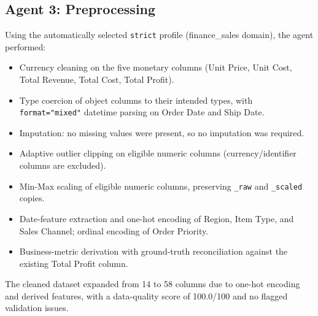 \documentclass[12pt,a4paper,openany]{report}
\begin{document}
\subsection{Agent 3: Preprocessing}
Using the automatically selected \texttt{strict} profile (finance\_sales domain), the agent performed:
\begin{itemize}
	\item Currency cleaning on the five monetary columns (Unit Price, Unit Cost, Total Revenue, Total Cost, Total Profit).
	\item Type coercion of object columns to their intended types, with \texttt{format="mixed"} datetime parsing on Order Date and Ship Date.
	\item Imputation: no missing values were present, so no imputation was required.
	\item Adaptive outlier clipping on eligible numeric columns (currency/identifier columns are excluded).
	\item Min-Max scaling of eligible numeric columns, preserving \texttt{\_raw} and \texttt{\_scaled} copies.
	\item Date-feature extraction and one-hot encoding of Region, Item Type, and Sales Channel; ordinal encoding of Order Priority.
	\item Business-metric derivation with ground-truth reconciliation against the existing Total Profit column.
\end{itemize}
The cleaned dataset expanded from 14 to 58 columns due to one-hot encoding and derived features, with a data-quality score of 100.0/100 and no flagged validation issues.
\end{document}
